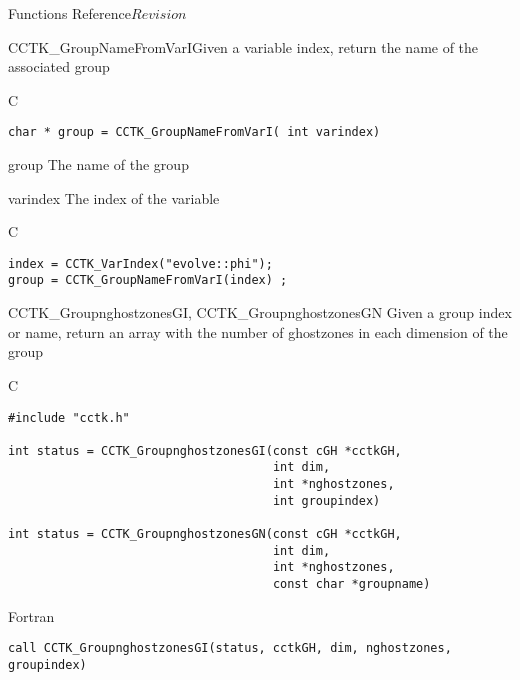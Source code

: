 \begin{cactuspart}{ Functions Reference}{}{$Revision$}
\begin{FunctionDescription}{CCTK\_GroupNameFromVarI}{Given a variable index, return the name of the associated group}
\label{CCTK-GroupNameFromVarI}
\begin{SynopsisSection}
\begin{Synopsis}{C}
\begin{verbatim}char * group = CCTK_GroupNameFromVarI( int varindex)\end{verbatim}
\end{Synopsis}
\end{SynopsisSection}
\begin{ParameterSection}
\begin{Parameter}{group}
The name of the group
\end{Parameter}
\begin{Parameter}{varindex}
The index of the variable
\end{Parameter}
\end{ParameterSection}

\begin{ExampleSection}
\begin{Example}{C}
\begin{verbatim}
index = CCTK_VarIndex("evolve::phi");
group = CCTK_GroupNameFromVarI(index) ;
\end{verbatim}
\end{Example}
\end{ExampleSection}
\end{FunctionDescription}



\begin{FunctionDescription}{CCTK\_GroupnghostzonesGI, CCTK\_GroupnghostzonesGN}
\label{CCTK-GroupnghostzonesGI}
\label{CCTK-GroupnghostzonesGN}
  Given a group index or name, return an array with the number of ghostzones in each dimension of the group
\begin{SynopsisSection}
\begin{Synopsis}{C}
\begin{verbatim}
#include "cctk.h"

int status = CCTK_GroupnghostzonesGI(const cGH *cctkGH,
                                     int dim,
                                     int *nghostzones,
                                     int groupindex)

int status = CCTK_GroupnghostzonesGN(const cGH *cctkGH,
                                     int dim,
                                     int *nghostzones,
                                     const char *groupname)
\end{verbatim}
\end{Synopsis}
\begin{Synopsis}{Fortran}
\begin{verbatim}
call CCTK_GroupnghostzonesGI(status, cctkGH, dim, nghostzones, groupindex)


\end{verbatim}
\end{Synopsis}
\end{SynopsisSection}
\end{FunctionDescription}
\end{cactuspart}
